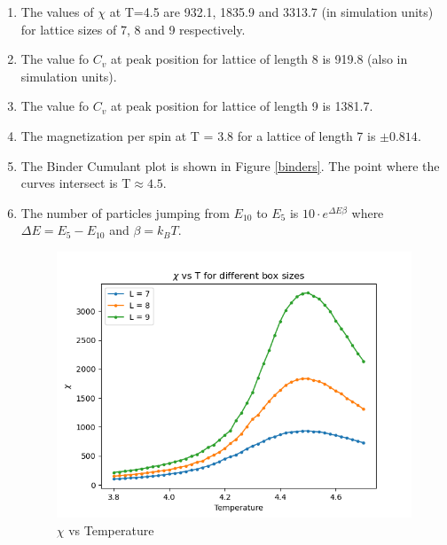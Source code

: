 \documentclass[11 pt]{article}
\begin{document}
\begin{enumerate}[resume]
\item The values of $\chi$ at T=4.5 are 932.1, 1835.9 and 3313.7 (in simulation units) for lattice sizes of 7, 8 and 9 respectively.

\item The value fo $C_v$ at peak position for lattice of length 8 is 919.8 (also in simulation units).

\item The value fo $C_v$ at peak position for lattice of length 9 is 1381.7.

\item The magnetization per spin at T = 3.8 for a lattice of length 7 is $\pm 0.814$.

\item The Binder Cumulant plot is shown in Figure \ref{binders}. The point where the curves intersect is T$\approx4.5$.

\item The number of particles jumping from $E_{10}$ to $E_5$ is $10\cdot e^{\Delta E \beta}$ where $\Delta E = E_{5} - E_{10}$ and $\beta = k_BT$.

\begin{figure}
\begin{center}
\includegraphics[width=3.0 in]{"../figures/Q7_chi_T.png"}
\caption{$\chi$ vs Temperature}
\label{chi}
\end{center}
\end{figure}
\end{enumerate}
\end{document}
